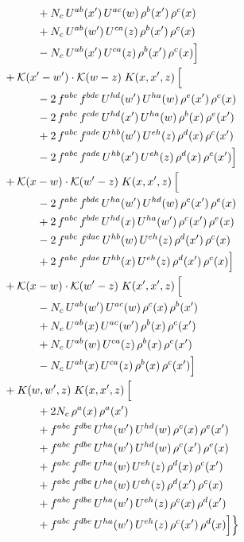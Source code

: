 \documentclass[10pt]{article}
\numberwithin{equation}{section}
\newcommand{\KK}{\mathcal K}
\begin{document}
\begin{align}
&\qquad\qquad +N_c\,U^{ab}(x')\,U^{ac}(w)\,\rho^{b}(x')\,\rho^{c}(x)\notag\\
&\qquad\qquad +N_c\,U^{ab}(w')\,U^{ca}(z)\,\rho^{b}(x')\,\rho^{c}(x)\notag\\
&\qquad\qquad - N_c\,U^{ab}(x')\,U^{ca}(z)\,\rho^{b}(x')\,\rho^{c}(x)\Big]\notag\\
&\quad +\KK(x'-w')\cdot\KK(w-z)\;K(x,x',z)\,\Big[\notag\\
&\qquad\qquad -2\,f^{abc}\,f^{bde}\,U^{hd}(w')\,U^{ha}(w)\,\rho^{e}(x')\,\rho^{c}(x)\notag\\
&\qquad\qquad -2\,f^{abc}\,f^{cde}\,U^{hd}(x')\,U^{ha}(w)\,\rho^{b}(x)\,\rho^{e}(x')\notag\\
&\qquad\qquad +2\,f^{abc}\,f^{ade}\,U^{hb}(w')\,U^{eh}(z)\,\rho^{d}(x)\,\rho^{c}(x')\notag\\
&\qquad\qquad -2\,f^{abc}\,f^{ade}\,U^{hb}(x')\,U^{eh}(z)\,\rho^{d}(x)\,\rho^{c}(x')\Big]\notag\\
&\quad +\KK(x-w)\cdot\KK(w'-z)\;K(x,x',z)\,\Big[\notag\\
&\qquad\qquad -2\,f^{abc}\,f^{bde}\,U^{ha}(w')\,U^{hd}(w)\,\rho^{c}(x')\,\rho^{e}(x)\notag\\
&\qquad\qquad +2\,f^{abc}\,f^{bde}\,U^{hd}(x)\,U^{ha}(w')\,\rho^{c}(x')\,\rho^{e}(x)\notag\\
&\qquad\qquad -2\,f^{abc}\,f^{dae}\,U^{hb}(w)\,U^{eh}(z)\,\rho^{d}(x')\,\rho^{c}(x)\notag\\
&\qquad\qquad +2\,f^{abc}\,f^{dae}\,U^{hb}(x)\,U^{eh}(z)\,\rho^{d}(x')\,\rho^{c}(x)\Big]\notag\\
&\quad +\KK(x-w)\cdot\KK(w'-z)\;K(x',x',z)\,\Big[\notag\\
&\qquad\qquad - N_c\,U^{ab}(w')\,U^{ac}(w)\,\rho^{c}(x)\,\rho^{b}(x')\notag\\
&\qquad\qquad +N_c\,U^{ab}(x)\,U^{ac}(w')\,\rho^{b}(x)\,\rho^{c}(x')\notag\\
&\qquad\qquad +N_c\,U^{ab}(w)\,U^{ca}(z)\,\rho^{b}(x)\,\rho^{c}(x')\notag\\
&\qquad\qquad - N_c\,U^{ab}(x)\,U^{ca}(z)\,\rho^{b}(x)\,\rho^{c}(x')\Big]\notag\\
&\quad +K(w,w',z)\;K(x,x',z)\,\Big[\notag\\
&\qquad\qquad +2 N_c\,\rho^{a}(x)\,\rho^{a}(x')\notag\\
&\qquad\qquad +f^{abc}\,f^{dbe}\,U^{ha}(w')\,U^{hd}(w)\,\rho^{c}(x)\,\rho^{e}(x')\notag\\
&\qquad\qquad +f^{abc}\,f^{dbe}\,U^{ha}(w')\,U^{hd}(w)\,\rho^{c}(x')\,\rho^{e}(x)\notag\\
&\qquad\qquad +f^{abc}\,f^{dbe}\,U^{ha}(w)\,U^{eh}(z)\,\rho^{d}(x)\,\rho^{c}(x')\notag\\
&\qquad\qquad +f^{abc}\,f^{dbe}\,U^{ha}(w)\,U^{eh}(z)\,\rho^{d}(x')\,\rho^{c}(x)\notag\\
&\qquad\qquad +f^{abc}\,f^{dbe}\,U^{ha}(w')\,U^{eh}(z)\,\rho^{c}(x)\,\rho^{d}(x')\notag\\
&\qquad\qquad +f^{abc}\,f^{dbe}\,U^{ha}(w')\,U^{eh}(z)\,\rho^{c}(x')\,\rho^{d}(x)\Big]\Big\}\label{B:eq:Bdecomp}
\end{align}
\end{document}
